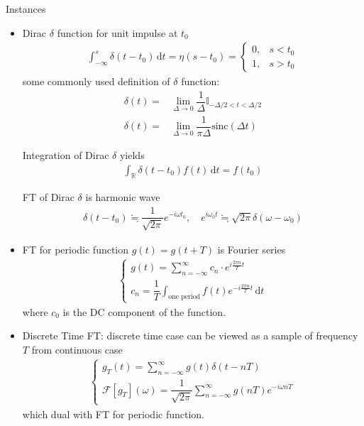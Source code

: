 Instances
\begin{itemize}[topsep=2pt,itemsep=0pt]
    \item Dirac $ \delta  $ function for unit impulse at $ t_0 $
    \begin{align}
        \int _{-\infty}^s \delta (t-t_0) \,\mathrm{d}t=\eta(s-t_0)=\begin{cases}
            0,&s<t_0\\
            1,&s>t_0
        \end{cases} 
    \end{align}
    some commonly used definition of $ \delta  $ function:
    \begin{align}
        \delta (t)=& \lim_{\Delta \to 0}\dfrac{1}{\Delta }\mathbb{I}_{-\Delta /2<t<\Delta /2}\\
        \delta (t)=&\lim_{\Delta \to 0}\dfrac{1}{\pi \Delta }\mathrm{sinc}(\Delta t)
    \end{align}

    Integration of Dirac $ \delta  $ yields
    \begin{align}
        \int _\mathbb{R} \delta (t-t_0)f(t) \,\mathrm{d}t  = f(t_0)
    \end{align}
    
    FT of Dirac $ \delta  $ is harmonic wave
    \begin{align}
        \delta (t-t_0)\fallingdotseq \dfrac{1}{\sqrt{2\pi}} e^{-i\omega t_0},\quad e^{i\omega _0t}\fallingdotseq \sqrt{2\pi} \delta (\omega -\omega _0)
    \end{align}

    
    
    \item FT for periodic function $ g(t)=g(t+T) $ is Fourier series
    \begin{align}
        \begin{cases}
            g(t)=\sum_{n=-\infty}^{\infty}c_n\cdot e^{i\frac{2\pi n}{T}t}\\
            c_n=\dfrac{1}{T}\int_{\text{one period}}f(t)e^{-i\frac{2\pi n}{T}t}\,\mathrm{d}t
        \end{cases} 
    \end{align}
    where $ c_0 $ is the DC component of the function.
    
    \item Discrete Time FT: discrete time case can be viewed as a sample of frequency $ T $ from continuous case 
    \begin{align}
        \begin{cases}
            g_T(t)=\sum_{n=-\infty}^\infty g(t)\delta (t-nT)\\
            \mathscr{F}\left[ g_T \right] (\omega )= \dfrac{1}{\sqrt{2\pi}}\sum_{n=-\infty}^{\infty}g(nT)e^{-i\omega nT}
        \end{cases}
    \end{align}
    which dual with FT for periodic function.
\end{itemize}

    
    
















